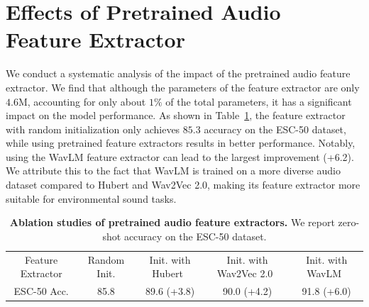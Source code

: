 
\section{Effects of Pretrained Audio Feature Extractor}
\label{app:audio_feature_extractor}

We conduct a systematic analysis of the impact of the pretrained audio feature extractor.
We find that although the parameters of the feature extractor are only $4.6$M, accounting for only about $1\%$ of the total parameters, it has a significant impact on the model performance. 
As shown in Table~\ref{tb:audio_ablation}, the feature extractor with random initialization only achieves $85.3$ accuracy on the ESC-50 dataset, while using pretrained feature extractors results in better performance. 
Notably, using the WavLM feature extractor can lead to the largest improvement (+6.2).
 We attribute this to the fact that WavLM is trained on a more diverse audio dataset compared to Hubert and Wav2Vec 2.0, making its feature extractor more suitable for environmental sound tasks.

 \begin{table}[h]
\centering
{}
\begin{tabular}{c|cccc}
  Feature Extractor & Random Init. & Init. with Hubert~\cite{hubert} & Init. with Wav2Vec 2.0~\cite{wav2vec2} & Init. with WavLM~\cite{wavlm}
  \\
  \shline
  ESC-50 Acc. & 85.8 &89.6 (+3.8)  & 90.0 (+4.2) & 91.8 (+6.0)
  \\
\end{tabular}
\caption{\textbf{Ablation studies of pretrained audio feature extractors.} We report zero-shot accuracy on the ESC-50 dataset.}
\label{tb:audio_ablation}
\end{table}



